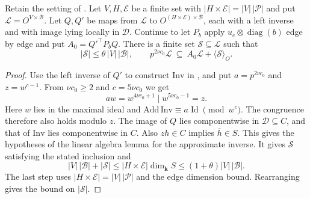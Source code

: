 \begin{lemma}
\label{lem:a-edge-few-generators}
\emitthmsource
Retain the setting of . Let $V,H,\mathcal E$ be a finite set with $|H\times\mathcal E|=|V|\,|\mathcal P|$ and put $\mathcal L=O^{V\times\mathcal B}$. Let $Q,Q'$ be maps from $\mathcal L$ to $O^{(H\times\mathcal E)\times\mathcal B}$, each with a left inverse and with image lying locally in $\mathcal D$. Continue to let $P_b$ apply $u_e\otimes\operatorname{diag}(b)$ edge by edge and put $A_0=Q'^\top P_bQ$. There is a finite set $\mathcal S\subseteq\mathcal L$ such that
\[
 |\mathcal S|\le\theta\,|V|\,|\mathcal B|,\qquad
 p^{2\nu c_0}\mathcal L\ \subseteq\ A_0\mathcal L+\langle\mathcal S\rangle_O .
\]
\end{lemma}
\begin{proof}
Use the left inverse of $Q'$ to construct $\mathrm{Inv}$ in , and put $a=p^{2\nu c_0}$ and $z=w^{c-1}$. From $\nu c_0\ge2$ and $c=5\nu c_0$ we get
\[
 aw=w^{4\nu c_0+1}\mid w^{5\nu c_0-1}=z .
\]
Here $w$ lies in the maximal ideal and $\mathrm{Add}\,\mathrm{Inv}\equiv a\operatorname{Id}\pmod{w^c}$. The congruence therefore also holds modulo $z$. The image of $Q$ lies componentwise in $\mathcal D\subseteq C$, and that of $\mathrm{Inv}$ lies componentwise in $C$. Also $zh\in C$ implies $\overline h\in S$. This gives the hypotheses of the linear algebra lemma for the approximate inverse. It gives $\mathcal S$ satisfying the stated inclusion and
\[
 |V|\,|\mathcal B|+|\mathcal S|
   \le |H\times\mathcal E|\dim_\mathbf k S
   \le (1+\theta)|V|\,|\mathcal B|.
\]
The last step uses $|H\times\mathcal E|=|V|\,|\mathcal P|$ and the edge dimension bound. Rearranging gives the bound on $|\mathcal S|$.
\end{proof}

